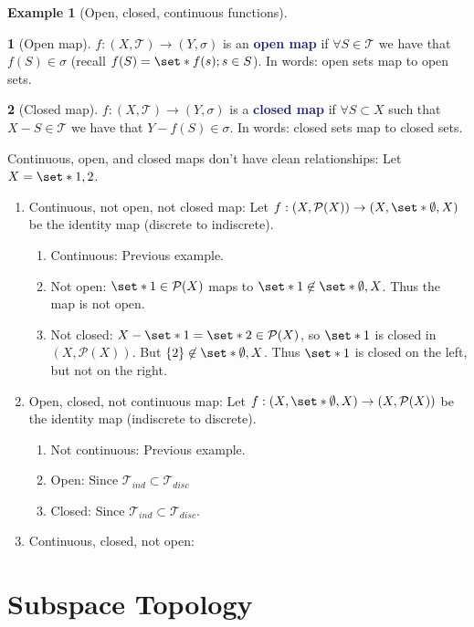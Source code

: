 \documentclass[11pt]{article}
\numberwithin{equation}{section}
\newcommand{\navy}[1]{\textcolor{MidnightBlue}{\bf #1}}
\theoremstyle{plain}
\theoremstyle{definition}
\newtheorem{definition}{\color{MidnightBlue}{\textbf{Definition}}}[section]
\newtheorem{example}{\color{WildStrawberry}Example}[section]
\def\Set{\set*}%
\def\ss{\subset}
\newcommand{\1}{\mathbbm 1}
\newcommand{\pP}{\mathcal P}
\newcommand{\tT}{\mathcal T}
\begin{document}
\begin{example}[Open, closed, continuous functions]
	\begin{definition}[Open map]
		$f: (X,\tT) \to (Y,\sigma)$ is an \navy{open map} if $\forall S \in \tT$ we have that $f(S) \in \sigma$ (recall $f(S) = \Set{f(s);s \in S}$). In words: open sets map to open sets. 
	\end{definition}

	\begin{definition}[Closed map]
		$f: (X,\tT) \to (Y,\sigma)$ is a \navy{closed map} if $\forall S \ss X$ such that $X - S \in \tT$ we have that $Y - f(S) \in \sigma$. In words: closed sets map to closed sets. 
	\end{definition}
	
	Continuous, open, and closed maps don't have clean relationships: Let $X = \Set{1,2}$.
	\begin{enumerate}
		\item Continuous, not open, not closed map: Let $f : (X,\pP(X)) \to (X,\Set{\emptyset,X})$ be the identity map (discrete to indiscrete). 
		\begin{enumerate}
			\item Continuous: Previous example.
			\item Not open: $\Set{1} \in \pP(X)$ maps to $\Set{1} \not\in \Set{\emptyset,X}$. Thus the map is not open.
			\item Not closed: $X - \Set{1} = \Set{2} \in \pP(X)$, so $\Set{1}$ is closed in $(X,\pP(X))$. But $\{2\} \not\in \Set{\emptyset,X}$. Thus $\Set{1}$ is closed on the left, but not on the right.
		\end{enumerate} 
		\item Open, closed, not continuous map: Let $f : (X,\Set{\emptyset,X}) \to (X,\pP(X))$ be the identity map (indiscrete to discrete).
		\begin{enumerate}
		 	\item Not continuous: Previous example. 
		 	\item Open: Since $\tT_{ind} \ss \tT_{disc}$ 
		 	\item Closed: Since $\tT_{ind} \ss \tT_{disc}$.
		 \end{enumerate} 
		 \item Continuous, closed, not open: 

	\end{enumerate}
\end{example}

\section{Subspace Topology}
\end{document}
